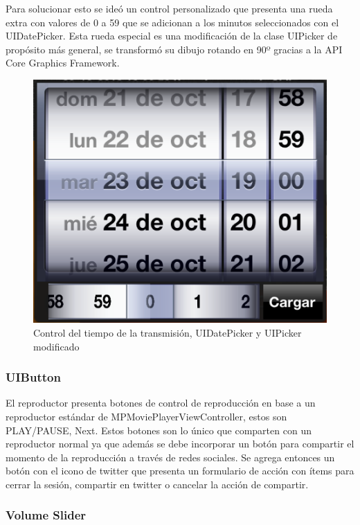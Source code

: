 Para solucionar esto se ideó un control personalizado que presenta una rueda extra con valores de 0 a 59 que se adicionan a los minutos seleccionados con el UIDatePicker. Esta rueda especial es una modificación de la clase UIPicker de propósito más general, se transformó su dibujo rotando en 90º gracias a la API Core Graphics Framework. 

\begin{figure}[H]
	\centering
	\includegraphics[scale=0.5]{imgs/datepicker-mod.png}
	\caption{Control del tiempo de la transmisión, UIDatePicker y UIPicker modificado}
	\label{datepicker-mod}	
\end{figure}
 
		\subsubsection{UIButton}
		El reproductor presenta botones de control de reproducción en base a un reproductor estándar de MPMoviePlayerViewController, estos son PLAY/PAUSE, Next. Estos botones son lo único que comparten con un reproductor normal ya que además se debe incorporar un botón para compartir el momento de la reproducción a través de redes sociales. Se agrega entonces un botón con el icono de twitter que presenta un formulario de acción con ítems para cerrar la sesión, compartir en twitter o cancelar la acción de compartir.
		
		\subsubsection{Volume Slider}

